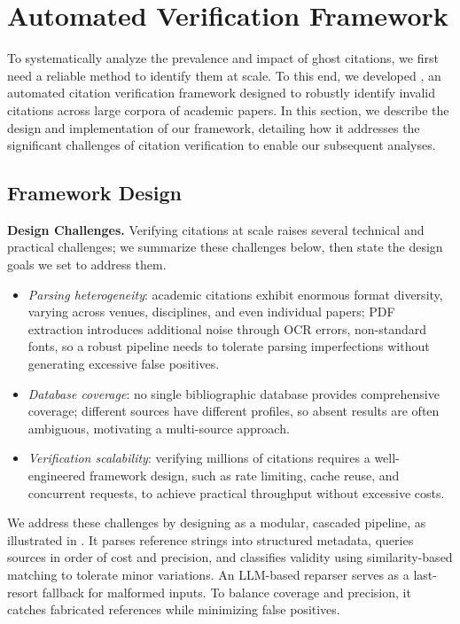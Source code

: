 
\section{Automated Verification Framework}
\label{sec:methodology}


To systematically analyze the prevalence and impact of ghost citations, we first need a reliable method to identify them at scale.
To this end, we developed \citeb, an automated citation verification framework designed to robustly identify invalid citations across large corpora of academic papers.
In this section, we describe the design and implementation of our \citeb framework, detailing how it addresses the significant challenges of citation verification to enable our subsequent analyses.


\subsection{Framework Design}
\label{subsec:framework_design}

\noindent
\textbf{Design Challenges.}
Verifying citations at scale raises several technical and practical challenges; we summarize these challenges below, then state the design goals we set to address them.
\begin{itemize}
    \item \textit{Parsing heterogeneity}: academic citations exhibit enormous format diversity, varying across venues, disciplines, and even individual papers; PDF extraction introduces additional noise through OCR errors, non-standard fonts, so a robust pipeline needs to tolerate parsing imperfections without generating excessive false positives.
    \item \textit{Database coverage}: no single bibliographic database provides comprehensive coverage; different sources have different profiles, so absent results are often ambiguous, motivating a multi-source approach.
    \item \textit{Verification scalability}: verifying millions of citations requires a well-engineered framework design, such as rate limiting, cache reuse, and concurrent requests, to achieve practical throughput without excessive costs.
\end{itemize}

We address these challenges by designing \citeb as a modular, cascaded pipeline, as illustrated in .
It parses reference strings into structured metadata, queries sources in order of cost and precision, and classifies validity using similarity-based matching to tolerate minor variations.
An LLM-based reparser serves as a last-resort fallback for malformed inputs.
To balance coverage and precision, it catches fabricated references while minimizing false positives.

